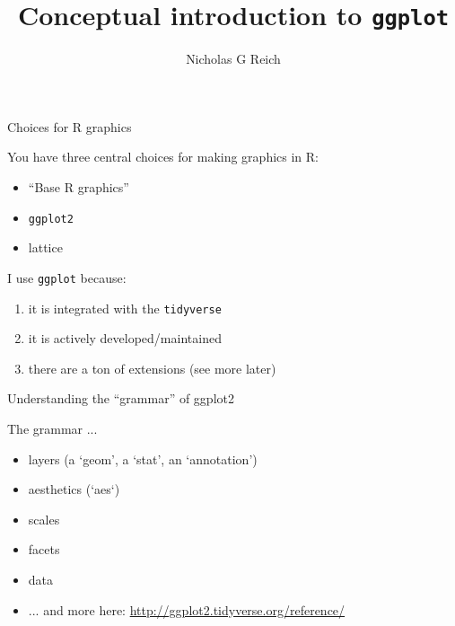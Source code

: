 \documentclass[table]{beamer}\usepackage[]{graphicx}\usepackage[]{color}
\title{Conceptual introduction to \tt ggplot}
\author{Nicholas G Reich}
\begin{document}
\begin{frame}[plain]
	\titlepage
\end{frame}





\begin{frame}{Choices for R graphics}

You have three central choices for making graphics in R:

\begin{itemize}
    \item ``Base R graphics''
    \item {\tt ggplot2}
    \item lattice
\end{itemize}

\vspace{2em}

I use {\tt ggplot} because:
\begin{enumerate}
    \item it is integrated with the {\tt tidyverse}
    \item it is actively developed/maintained
    \item there are a ton of extensions (see more later)
\end{enumerate}


\end{frame}



\begin{frame}[fragile]{Understanding the ``grammar'' of ggplot2}

The grammar ...

\begin{itemize}
    \item layers (a `geom', a `stat', an `annotation')
    \item aesthetics (`aes`)
    \item scales
    \item facets
    \item data
    \item ... and more here: \href{http://ggplot2.tidyverse.org/reference/}{http://ggplot2.tidyverse.org/reference/}
\end{itemize}

\end{frame}
\end{document}

